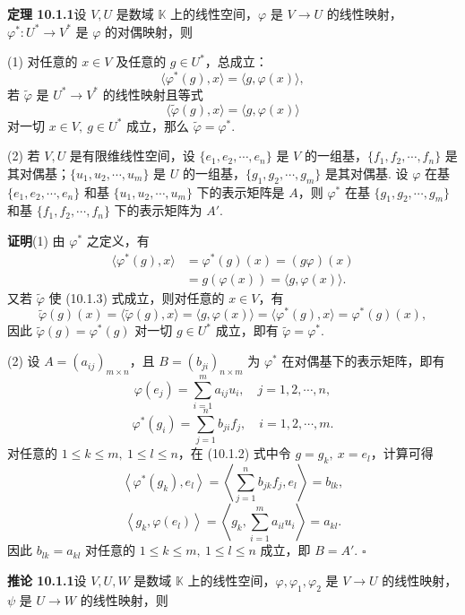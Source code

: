 \documentclass[UTF8,12pt,a4paper,fontset=fandol]{ctexart}
\begin{document}
\noindent\textbf{定理 10.1.1}\quad 设 $V,U$ 是数域 $\mathbb K$ 上的线性空间，$\varphi$ 是 $V\to U$ 的线性映射，$\varphi^*:U^*\to V^*$ 是 $\varphi$ 的对偶映射，则

(1) 对任意的 $x\in V$ 及任意的 $g\in U^*$，总成立：
\begin{equation}
  \langle\varphi^*(g),x\rangle=\langle g,\varphi(x)\rangle,
  \tag{10.1.2}
\end{equation}
若 $\widetilde\varphi$ 是 $U^*\to V^*$ 的线性映射且等式
\begin{equation}
  \langle\widetilde\varphi(g),x\rangle=\langle g,\varphi(x)\rangle
  \tag{10.1.3}
\end{equation}
对一切 $x\in V,\ g\in U^*$ 成立，那么 $\widetilde\varphi=\varphi^*$.

(2) 若 $V,U$ 是有限维线性空间，设 $\{e_1,e_2,\cdots,e_n\}$ 是 $V$ 的一组基，$\{f_1,f_2,\cdots,f_n\}$ 是其对偶基；$\{u_1,u_2,\cdots,u_m\}$ 是 $U$ 的一组基，$\{g_1,g_2,\cdots,g_m\}$ 是其对偶基. 设 $\varphi$ 在基 $\{e_1,e_2,\cdots,e_n\}$ 和基 $\{u_1,u_2,\cdots,u_m\}$ 下的表示矩阵是 $A$，则 $\varphi^*$ 在基 $\{g_1,g_2,\cdots,g_m\}$ 和基 $\{f_1,f_2,\cdots,f_n\}$ 下的表示矩阵为 $A'$.

\noindent\textbf{证明}\quad (1) 由 $\varphi^*$ 之定义，有
\[
\begin{aligned}
  \langle\varphi^*(g),x\rangle&=\varphi^*(g)(x)=(g\varphi)(x)\\
  &=g(\varphi(x))=\langle g,\varphi(x)\rangle.
\end{aligned}
\]
又若 $\widetilde\varphi$ 使 (10.1.3) 式成立，则对任意的 $x\in V$，有
\[
  \widetilde\varphi(g)(x)=\langle\widetilde\varphi(g),x\rangle=\langle g,\varphi(x)\rangle
  =\langle\varphi^*(g),x\rangle=\varphi^*(g)(x),
\]
因此 $\widetilde\varphi(g)=\varphi^*(g)$ 对一切 $g\in U^*$ 成立，即有 $\widetilde\varphi=\varphi^*$.

(2) 设 $A=(a_{ij})_{m\times n}$，且 $B=(b_{ji})_{n\times m}$ 为 $\varphi^*$ 在对偶基下的表示矩阵，即有
\[
  \varphi(e_j)=\sum_{i=1}^m a_{ij}u_i,\quad j=1,2,\cdots,n,
\]
\[
  \varphi^*(g_i)=\sum_{j=1}^n b_{ji}f_j,\quad i=1,2,\cdots,m.
\]
对任意的 $1\le k\le m,\ 1\le l\le n$，在 (10.1.2) 式中令 $g=g_k,\ x=e_l$，计算可得
\[
  \left\langle\varphi^*(g_k),e_l\right\rangle
  =\left\langle\sum_{j=1}^n b_{jk}f_j,e_l\right\rangle=b_{lk},
\]
\[
  \left\langle g_k,\varphi(e_l)\right\rangle
  =\left\langle g_k,\sum_{i=1}^m a_{il}u_i\right\rangle=a_{kl}.
\]
因此 $b_{lk}=a_{kl}$ 对任意的 $1\le k\le m,\ 1\le l\le n$ 成立，即 $B=A'$. $\square$

\noindent\textbf{推论 10.1.1}\quad 设 $V,U,W$ 是数域 $\mathbb K$ 上的线性空间，$\varphi,\varphi_1,\varphi_2$ 是 $V\to U$ 的线性映射，$\psi$ 是 $U\to W$ 的线性映射，则
\end{document}
